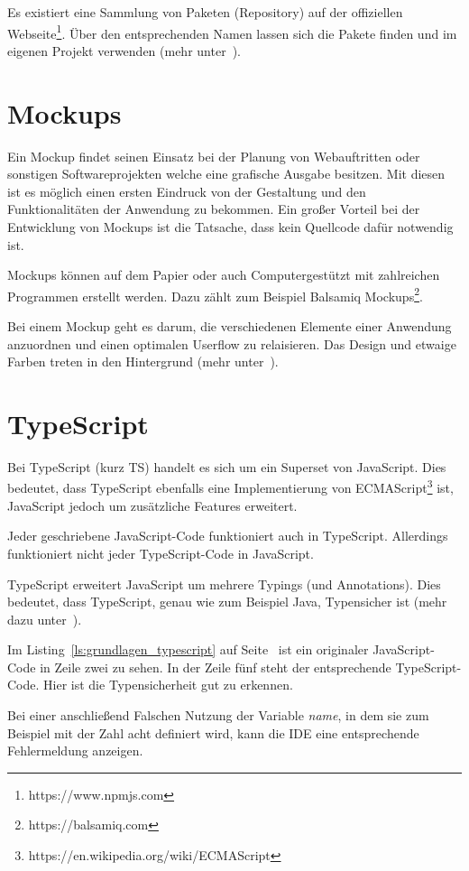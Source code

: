 Es existiert eine Sammlung von Paketen (Repository) auf der offiziellen Webseite\footnote{https://www.npmjs.com}. Über
den entsprechenden Namen lassen sich die Pakete finden und im eigenen Projekt verwenden
(mehr unter~\cite{book_grundlagen_npm}).

\section{Mockups}
Ein Mockup findet seinen Einsatz bei der Planung von Webauftritten oder sonstigen Softwareprojekten welche eine
grafische Ausgabe besitzen. Mit diesen ist es möglich einen ersten Eindruck von der Gestaltung und den Funktionalitäten
der Anwendung zu bekommen. Ein großer Vorteil bei der Entwicklung von Mockups ist die Tatsache, dass kein Quellcode
dafür notwendig ist.

Mockups können auf dem Papier oder auch Computergestützt mit zahlreichen Programmen erstellt werden. Dazu zählt zum
Beispiel Balsamiq Mockups\footnote{https://balsamiq.com}.

Bei einem Mockup geht es darum, die verschiedenen Elemente einer Anwendung anzuordnen und einen optimalen Userflow
zu relaisieren. Das Design und etwaige Farben treten in den Hintergrund (mehr unter~\cite{book_grundlagen_mockups}).

\section{TypeScript}
Bei TypeScript (kurz TS) handelt es sich um ein Superset von JavaScript. Dies bedeutet, dass TypeScript ebenfalls eine
Implementierung von ECMAScript\footnote{https://en.wikipedia.org/wiki/ECMAScript} ist, JavaScript jedoch um zusätzliche
Features erweitert.

Jeder geschriebene JavaScript-Code funktioniert auch in TypeScript. Allerdings funktioniert nicht jeder TypeScript-Code
in JavaScript.

TypeScript erweitert JavaScript um mehrere Typings (und Annotations). Dies bedeutet, dass TypeScript, genau wie zum
Beispiel Java, Typensicher ist (mehr dazu unter~\cite{book_grundlagen_typescript}).

Im Listing~\ref{ls:grundlagen_typescript} auf Seite~\pageref{ls:grundlagen_typescript} ist ein originaler
JavaScript-Code in Zeile zwei zu sehen. In der Zeile fünf steht der entsprechende TypeScript-Code. Hier ist die
Typensicherheit gut zu erkennen.

Bei einer anschließend Falschen Nutzung der Variable \textit{name}, in dem sie zum Beispiel mit der Zahl acht definiert
wird, kann die IDE eine entsprechende Fehlermeldung anzeigen.

